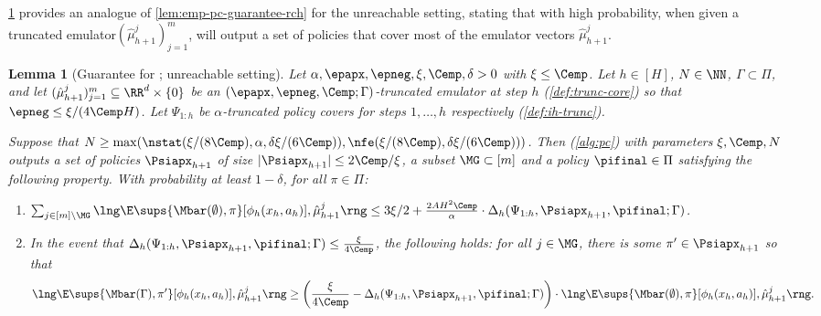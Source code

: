 \documentclass[11pt, oneside]{article}
\theoremstyle{plain}
\newtheorem{lemma}[theorem]{Lemma}
\theoremstyle{definition}
\numberwithin{theorem}{section}
\newcommand{\trunccore}{truncated emulator\xspace}
\renewcommand{\^}[1]{^{(#1)}}
\begin{document}
\cref{lem:emp-pc-guarantee} provides an analogue of \cref{lem:emp-pc-guarantee-rch} for the unreachable setting, stating that with high probability, when given a \trunccore $(\hat \mu_{h+1}^j)_{j=1}^m$, \PC will output a set of policies that cover most of the emulator vectors $\hat \mu_{h+1}^j$. %
\begin{lemma}[Guarantee for \PC;  unreachable setting]
  \label{lem:emp-pc-guarantee}
  Let $\alpha,\epapx,\epneg,\xi,\Cemp,\delta>0$ with $\xi \leq \Cemp$. Let $h \in [H]$, $N \in \NN$, $\Gamma \subset \Pi$, and let $(\hat\mu_{h+1}^j)_{j=1}^m \subseteq \RR^d\times\{0\}$ be an $(\epapx, \epneg, \Cemp; \Gamma)$-\trunccore at step $h$ (\cref{def:trunc-core}) so that $\epneg \leq \xi/(4\Cemp H)$. 
  Let $\Psi_{1:h}$ be $\alpha$-truncated policy covers for steps $1,\dots,h$ respectively (\cref{def:ih-trunc}).
  
  Suppose that $N \geq \max(\nstat(\xi/(8\Cemp), \alpha, \delta\xi/(6\Cemp)), \nfe(\xi/(8\Cemp), \delta\xi/(6\Cemp)))$. Then \PC (\cref{alg:pc}) with parameters $\xi,\Cemp,N$ outputs a set of policies $\Psiapx_{h+1}$ of size $|\Psiapx_{h+1}| \leq 2\Cemp/\xi$, a subset $\MG \subset [m]$ and a policy $\pifinal \in \Pi$ satisfying the following property.  %
With probability at least $1-\delta$, for all $\pi \in \Pi$:
  \begin{enumerate}
  \item \label{it:bad-inds-bound-trunc} $\sum_{j \in [m]\setminus \MG} \lng \E\sups{\Mbar(\emptyset), \pi}[\phi_h(x_h, a_h)], \hat \mu_{h+1}^j \rng \leq 3\xi/2 + \frac{2AH^2\Cemp}{\alpha} \cdot \Delta_h(\Psi_{1:h}, \Psiapx_{h+1}, \pifinal; \Gamma)$. 
  \item     \label{it:good-inds-bound-trunc} In the event that $\Delta_h(\Psi_{1:h}, \Psiapx_{h+1}, \pifinal; \Gamma) \leq \frac{\xi}{4\Cemp}$, the following holds: for all $j \in \MG$, there is some $\pi' \in \Psiapx_{h+1}$ so that
    \begin{align}
      \lng\E\sups{\Mbar(\Gamma), \pi'}[\phi_h(x_h, a_h)], \hat \mu_{h+1}^j \rng \geq  \left( \frac{\xi}{4\Cemp} - \Delta_h(\Psi_{1:h}, \Psiapx_{h+1}, \pifinal; \Gamma) \right) \cdot \lng \E\sups{\Mbar(\emptyset), \pi}[\phi_h(x_h, a_h)], \hat \mu_{h+1}^j \rng .\nonumber
    \end{align}
  \end{enumerate}
\end{lemma}
\end{document}
